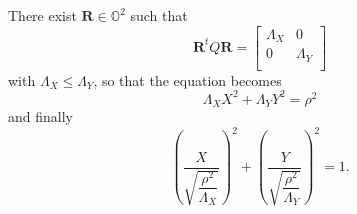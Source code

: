 \documentclass[aps]{revtex4}
\begin{document}
There exist $\bm{R}\in\mathbb{O}^2$ such that
\begin{equation}
\bm{R}^tQ\bm{R} = \begin{bmatrix}
\Lambda_X & 0 \\
0         & \Lambda_Y\\
\end{bmatrix}
\end{equation}
with $\Lambda_X\leq\Lambda_Y$, so that the equation becomes
\begin{equation}
	\Lambda_X X^2 + \Lambda_Y Y^2 = \rho^2
\end{equation}
and finally
\begin{equation}
	\left(\dfrac{X}{\sqrt{\dfrac{\rho^2}{\Lambda_X}}}\right)^2
	 + \left(\dfrac{Y}{\sqrt{\dfrac{\rho^2}{\Lambda_Y}}}\right)^2 = 1.
\end{equation}
\end{document}
